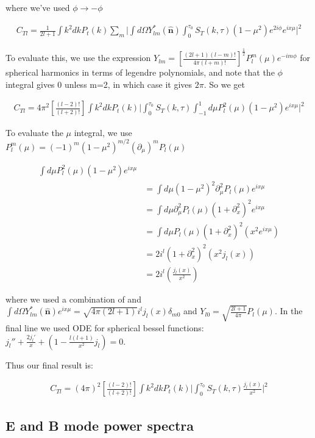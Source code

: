 \documentclass[a4paper,11pt]{article}
\renewcommand{\v}[1]{\mathbf{#1}}
\newcommand{\half}{\frac{1}{2}}
\newcommand{\unit}[1]{\hat{\v{#1}}}
\newcommand{\ltwof}{[\frac{(l-2)!}{(l+2)!}]}
\begin{document}
where we've used $\phi\rightarrow -\phi$ 

\begin{align}
C_{Tl} = \frac{1}{2l+1} \int k^2 dk P_t(k) \sum_m \bigg| \int d\Omega Y^*_{lm}(\unit{n}) \int_0^{\tau_0} S_T(k,\tau)(1-\mu^2)e^{2i\phi}e^{ix\mu} \bigg|^2
\end{align}

To evaluate this, we use the expression $Y_{lm} = [\frac{(2l+1)(l-m)!}{4\pi(l+m)!}]^\half P_l^m(\mu)e^{-im\phi}$ for spherical harmonics in terms of legendre polynomials, and note that the $\phi$ integral gives 0 unless m=2, in which case it gives $2\pi$. So we get 

\begin{align}
C_{Tl} = 4\pi^2\ltwof \int k^2 dk P_t(k) \bigg|  \int_0^{\tau_0} S_T(k,\tau)\int_{-1}^1 d\mu P_l^2(\mu)(1-\mu^2)e^{ix\mu} \bigg|^2
\end{align}

To evaluate the $\mu$ integral, we use $P^m_l(\mu)=(-1)^m(1-\mu^2)^{m/2}(\partial_\mu)^mP_l(\mu)$


\begin{align}
\int d\mu P_l^2(\mu)(1-\mu^2)e^{ix\mu} \\
&= \int d\mu(1-\mu^2)^2 \partial_\mu^2P_l(\mu)e^{ix\mu}\\
&= \int d\mu \partial_\mu^2P_l(\mu)(1+\partial_x^2)^2e^{ix\mu}\\
&= \int d\mu P_l(\mu)(1+\partial_x^2)^2(x^2e^{ix\mu})\\
&= 2i^l(1+\partial_x^2)^2(x^2j_l(x))\\
&= 2i^l(\frac{j_l(x)}{x^2})
\end{align}

where we used a combination of and $\int d\Omega Y_{lm}^*(\unit{n})e^{ix\mu} = \sqrt{4\pi(2l+1)}i^l j_l(x) \delta_{m0}$ and $Y_{l0} = \sqrt{\frac{2l+1}{4\pi}}P_l(\mu)$. In the final line we used ODE for spherical bessel functions: $j_l''+\frac{2j_l'}{x}+(1-\frac{l(l+1)}{x^2}j_l)=0$.

Thus our final result is:

\begin{align}
C_{Tl} = (4\pi)^2\ltwof \int k^2 dk P_t(k) \bigg|  \int_0^{\tau_0} S_T(k,\tau)\frac{j_l(x)}{x^2} \bigg|^2
\end{align}

\subsection{E and B mode power spectra}
\end{document}
